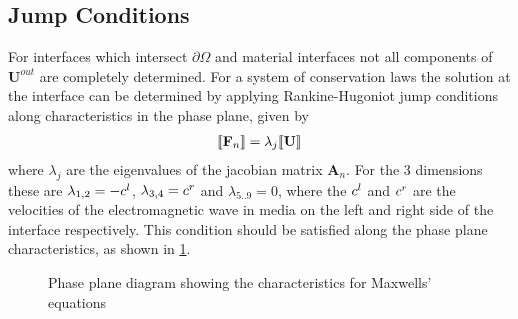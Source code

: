 
\subsection{Jump Conditions}
For interfaces which intersect $\partial \Omega$ and material interfaces not all components of $\mathbf{U}^{out}$ are completely determined. For a system of conservation laws the solution at the interface can be determined by applying  Rankine-Hugoniot jump conditions along characteristics in the phase plane, given by
\begin{align}
\llbracket  \mathbf{F}_n  \rrbracket = \lambda_j \llbracket  \mathbf{U}  \rrbracket \label{eq:rankine-hugoniot}
\end{align}
where $\lambda_j$ are the eigenvalues of the jacobian matrix $\mathbf{A}_n$.
For the 3 dimensions these are $ \lambda_{ 1,2 } = - c^l $, $
\lambda_{ 3,4 } = c^r $ and $\lambda_{5..9} = 0 $, where the
$c^l$ and $c^r$ are the velocities of the
electromagnetic wave in media on the left and right side of the interface
respectively. This condition should be satisfied along the phase plane
characteristics, as shown in \ref{fig:phase-plane-characteristics}.

\begin{figure}[h]
  \centering
  
  \caption{Phase plane diagram showing the characteristics for Maxwells' equations}
  \label{fig:phase-plane-characteristics}
\end{figure}

